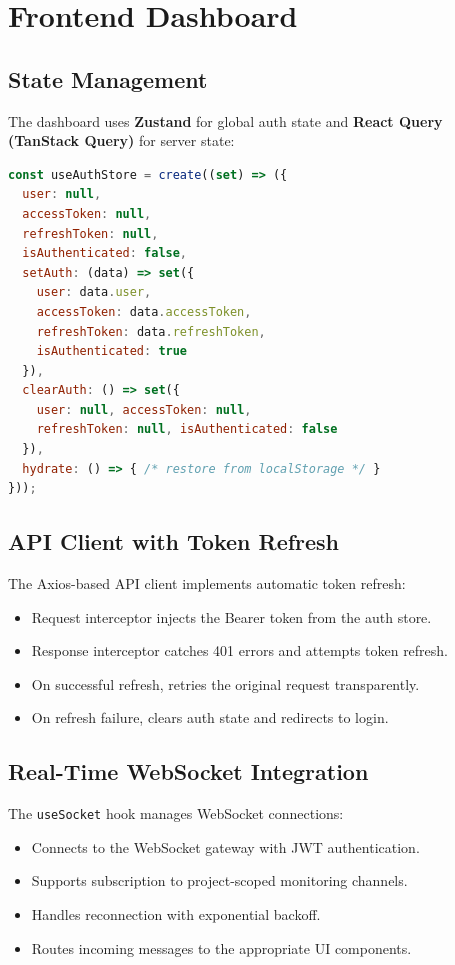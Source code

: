 \documentclass[12pt,a4paper,twoside]{report}
\begin{document}
\section{Frontend Dashboard}

\subsection{State Management}

The dashboard uses \textbf{Zustand} for global auth state and \textbf{React Query (TanStack Query)} for server state:

\begin{lstlisting}[language=JavaScript, caption={Zustand Auth Store}]
const useAuthStore = create((set) => ({
  user: null,
  accessToken: null,
  refreshToken: null,
  isAuthenticated: false,
  setAuth: (data) => set({
    user: data.user,
    accessToken: data.accessToken,
    refreshToken: data.refreshToken,
    isAuthenticated: true
  }),
  clearAuth: () => set({
    user: null, accessToken: null,
    refreshToken: null, isAuthenticated: false
  }),
  hydrate: () => { /* restore from localStorage */ }
}));
\end{lstlisting}

\subsection{API Client with Token Refresh}

The Axios-based API client implements automatic token refresh:

\begin{itemize}[noitemsep]
  \item Request interceptor injects the Bearer token from the auth store.
  \item Response interceptor catches 401 errors and attempts token refresh.
  \item On successful refresh, retries the original request transparently.
  \item On refresh failure, clears auth state and redirects to login.
\end{itemize}

\subsection{Real-Time WebSocket Integration}

The \texttt{useSocket} hook manages WebSocket connections:

\begin{itemize}[noitemsep]
  \item Connects to the WebSocket gateway with JWT authentication.
  \item Supports subscription to project-scoped monitoring channels.
  \item Handles reconnection with exponential backoff.
  \item Routes incoming messages to the appropriate UI components.
\end{itemize}
\end{document}
